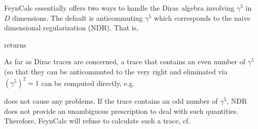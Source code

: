 \documentclass[../FeynCalcManual.tex]{subfiles}
\begin{document}
FeynCalc essentially offers two ways to handle the Dirac algebra
involving \(\gamma^5\) in \(D\) dimensions. The default is anticommuting
\(\gamma^5\) which corresponds to the naive dimensional regularization
(NDR). That is,

\begin{Shaded}
\begin{Highlighting}[]
\OperatorTok{[}\OperatorTok{[}\OperatorTok{]}\OperatorTok{[}\OperatorTok{]]}
\end{Highlighting}
\end{Shaded}

returns

\begin{Shaded}
\begin{Highlighting}[]
\SpecialCharTok{{-}}\OperatorTok{[}\OperatorTok{]}\OperatorTok{[}\OperatorTok{]}
\end{Highlighting}
\end{Shaded}

As far as Dirac traces are concerned, a trace that contains an even
number of \(\gamma^5\) (so that they can be anticommuted to the very
right and eliminated via \((\gamma^5)^2 = 1\) can be computed directly,
e.g.

\begin{Shaded}
\begin{Highlighting}[]
\OperatorTok{[}\OperatorTok{[}\OperatorTok{[}\OperatorTok{,}\OperatorTok{,}\OperatorTok{,}\OperatorTok{]}\OperatorTok{[}\OperatorTok{]}\OperatorTok{[}\OperatorTok{,}\OperatorTok{]}\OperatorTok{[}\OperatorTok{]]]}
\end{Highlighting}
\end{Shaded}

does not cause any problems. If the trace contains an odd number of
\(\gamma^5\), NDR does not provide an unambiguous prescription to deal
with such quantities. Therefore, FeynCalc will refuse to calculate such
a trace, cf.

\begin{Shaded}
\begin{Highlighting}[]
\OperatorTok{[}\OperatorTok{[}\OperatorTok{[}\OperatorTok{,}\OperatorTok{,}\OperatorTok{,}\OperatorTok{]}\OperatorTok{[}\OperatorTok{]]]}
\end{Highlighting}
\end{Shaded}
\end{document}
